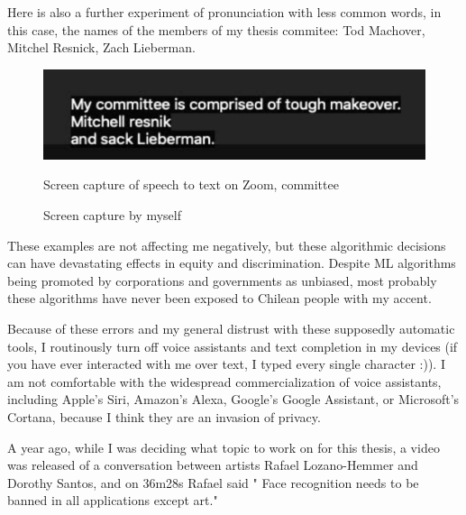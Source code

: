 Here is also a further experiment of pronunciation with less common words, in this case, the names of the members of my thesis commitee: Tod Machover, Mitchel Resnick, Zach Lieberman.

\begin{figure}[ht]
  \centering
  \includegraphics[width=0.75\linewidth,height=0.25\textheight,keepaspectratio]{images/zoom-commitee.jpg}
  \caption{Screen capture of speech to text on Zoom, committee}
  \caption*{Screen capture by myself}
  \label{fig:zoom-committee}
\end{figure}

These examples are not affecting me negatively, but these algorithmic decisions can have devastating effects in equity and discrimination.  Despite \acrshort{ML} algorithms being promoted by corporations and governments as unbiased, most probably these algorithms have never been exposed to Chilean people with my accent.

Because of these errors and my general distrust with these supposedly automatic tools, I routinously turn off voice assistants and text completion in my devices (if you have ever interacted with me over text, I typed every single character :)). I am not comfortable with the widespread commercialization of voice assistants, including Apple's Siri, Amazon's Alexa,  Google's Google Assistant, or Microsoft's Cortana, because I think they are an invasion of privacy.

A year ago, while I was deciding what topic to work on for this thesis, a video \cite{website-talk-technology-and-public-art-rafael-lozano-hemmer} was released of a conversation between artists Rafael Lozano-Hemmer and Dorothy Santos, and on 36m28s Rafael said " Face recognition needs to be banned in all applications except art."

